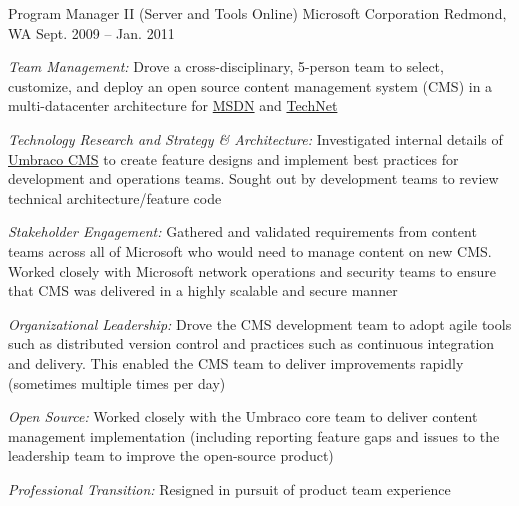 \begin{cventries}
\cventry 
{Program Manager II (Server and Tools Online)}
{Microsoft Corporation}
{Redmond, WA}
{Sept. 2009 – Jan. 2011}
{ %
\begin{cvitems}
\item {\emph{Team Management:} Drove a cross-disciplinary, 5-person team to select, customize, and deploy an open source content management system (CMS) in a multi-datacenter architecture for \href{https://msdn.microsoft.com}{MSDN} and \href{https://technet.microsoft.com}{TechNet} }
\item {\emph{Technology Research and Strategy \& Architecture:} Investigated internal details of \href{https://umbraco.com}{Umbraco CMS} to create feature designs and implement best practices for development and operations teams. Sought out by development teams to review technical architecture/feature code }
\item {\emph{Stakeholder Engagement:} Gathered and validated requirements from content teams across all of Microsoft who would need to manage content on new CMS. Worked closely with Microsoft network operations and security teams to ensure that CMS was delivered in a highly scalable and secure manner }
\item {\emph{Organizational Leadership:} Drove the CMS development team to adopt agile tools such as distributed version control and practices such as continuous integration and delivery. This enabled the CMS team to deliver improvements rapidly (sometimes multiple times per day) }
\item {\emph{Open Source:} Worked closely with the Umbraco core team to deliver content management implementation (including reporting feature gaps and issues to the leadership team to improve the open-source product) }
\item {\emph{Professional Transition:} Resigned in pursuit of product team experience }
\end{cvitems}
}



\end{cventries}
